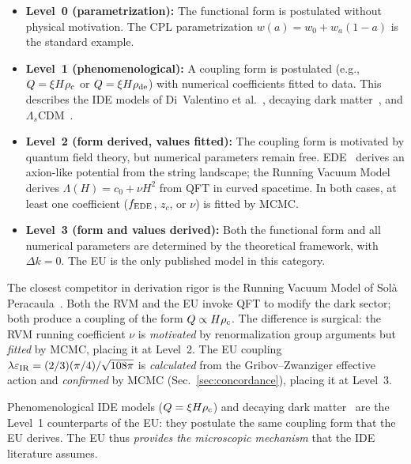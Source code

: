 \documentclass[a4paper,fleqn]{cas-dc}
\newcommand{\rhoc}{\rho_{\rm c}}
\begin{document}
\begin{itemize}
\item \textbf{Level~0 (parametrization):}
  The functional form is postulated without physical
  motivation. The CPL parametrization
  $w(a) = w_0 + w_a(1-a)$ is the standard example.

\item \textbf{Level~1 (phenomenological):}
  A coupling form is postulated
  (e.g., $Q = \xi H\rhoc$ or $Q = \xi H\rho_{\rm de}$)
  with numerical coefficients fitted to data. This
  describes the IDE models of
  Di~Valentino et al.~\cite{divalentino2020},
  decaying dark matter~\cite{vattis2019},
  and $\Lambda_s$CDM~\cite{akarsu2023}.

\item \textbf{Level~2 (form derived, values fitted):}
  The coupling form is motivated by quantum field theory,
  but numerical parameters remain free.
  EDE~\cite{poulin2019_ede} derives an axion-like potential
  from the string landscape; the Running Vacuum
  Model~\cite{sola2017_rvm} derives
  $\Lambda(H) = c_0 + \nu H^2$ from QFT in curved
  spacetime. In both cases, at least one coefficient
  ($f_{\rm EDE}$, $z_c$, or $\nu$) is fitted by MCMC.

\item \textbf{Level~3 (form and values derived):}
  Both the functional form and all numerical parameters
  are determined by the theoretical framework, with
  $\Delta k = 0$. The EU is the only published model
  in this category.
\end{itemize}

The closest competitor in derivation rigor is the
Running Vacuum Model of Sol\`a
Peracaula~\cite{sola2017_rvm}. Both the RVM and the EU
invoke QFT to modify the dark sector; both produce
a coupling of the form $Q \propto H\rhoc$. The
difference is surgical: the RVM running coefficient
$\nu$ is \textit{motivated} by renormalization group
arguments but \textit{fitted} by MCMC, placing it at
Level~2. The EU coupling
$\lambda\varepsilon_{\rm IR} = (2/3)({\pi}/{4})/\sqrt{108\pi}$
is \textit{calculated} from the Gribov--Zwanziger
effective action and \textit{confirmed} by MCMC
(Sec.~\ref{sec:concordance}), placing it at Level~3.

Phenomenological IDE models ($Q = \xi H\rhoc$)
and decaying dark matter~\cite{vattis2019}
are the Level~1 counterparts of the EU:
they postulate the same coupling form that the EU
derives. The EU thus \textit{provides the microscopic
mechanism} that the IDE literature assumes.
\end{document}
